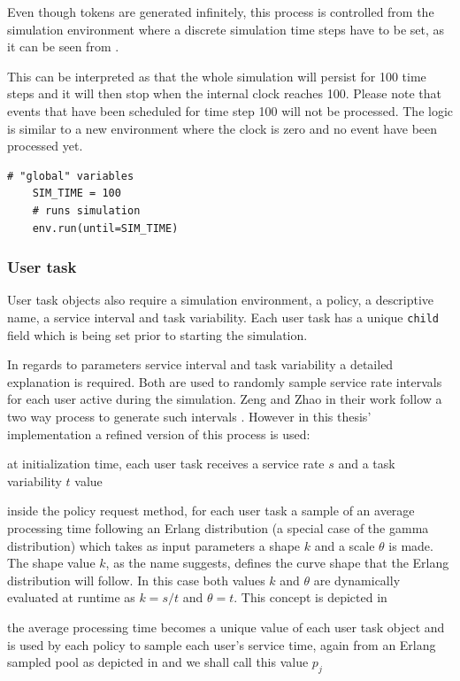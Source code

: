 \documentclass{seal_thesis}
\begin{document}
Even though tokens are generated infinitely, this process is controlled from the simulation environment where a discrete simulation time steps have to be set, as it can be seen from .

This can be interpreted as that the whole simulation will persist for 100 time steps and it will then stop when the internal clock reaches 100. Please note that events that have been scheduled for time step 100 will not be processed. The logic is similar to a new environment where the clock is zero and no event have been processed yet.

\begin{lstlisting}[caption=Starting the simulation with discrete time steps,label=lst:simulation_steps,style=CustomPython]
    # "global" variables
    SIM_TIME = 100
    # runs simulation
    env.run(until=SIM_TIME)
\end{lstlisting}

\subsubsection{User task}
\label{subsec:user_task}

User task objects also require a simulation environment, a policy, a descriptive name, a service interval and task variability. Each user task has a unique \texttt{child} field which is being set prior to starting the simulation.

In regards to parameters service interval and task variability a detailed explanation is required. Both are used to randomly sample service rate intervals for each user active during the simulation. Zeng and Zhao in their work follow a two way process to generate such intervals \cite[p. 8]{Zeng2005}. However in this thesis' implementation a refined version of this process is used:
\begin{enumerate*}
	\item at initialization time, each user task receives a service rate $s$ and a task variability $t$ value
	\item inside the policy request method, for each user task a sample of an average processing time following an Erlang distribution (a special case of the gamma distribution) which takes as input parameters a shape $k$ and a scale $\theta$ is made. The shape value $k$, as the name suggests, defines the curve shape that the Erlang distribution will follow. In this case both values $k$ and $\theta$ are dynamically evaluated at runtime as $k=s/t$ and $\theta = t$. This concept is depicted in 
	\item the average processing time becomes a unique value of each user task object and is used by each policy to sample each user's service time, again from an Erlang sampled pool as depicted in  and we shall call this value $p_j$
\end{enumerate*}
\end{document}
